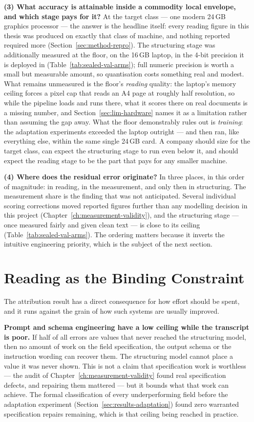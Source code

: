 \textbf{(3) What accuracy is attainable inside a commodity local envelope, and which stage pays
for it?} At the target class --- one modern 24\,\ac{GB} graphics processor --- the answer is
the headline itself: every reading figure in this thesis was produced on exactly that class of
machine, and nothing reported required more (Section~\ref{sec:method-repro}). The structuring stage
was additionally measured at the floor, on the 16\,\ac{GB} laptop, in the 4-bit precision it
is deployed in (Table~\ref{tab:sealed-val-arms}); full numeric precision is worth a small but
measurable amount, so quantisation costs something real and modest. What remains unmeasured is
the floor's \emph{reading} quality: the laptop's memory ceiling forces a pixel cap that reads
an A4 page at roughly half resolution, so while the pipeline loads and runs there, what it
scores there on real documents is a missing number, and Section~\ref{sec:lim-hardware} names it as a
limitation rather than assuming the gap away. What the floor demonstrably rules out is
\emph{training}: the adaptation experiments exceeded the laptop outright --- and then ran,
like everything else, within the same single 24\,\ac{GB} card. A company should size for the
target class, can expect the structuring stage to run even below it, and should expect the
reading stage to be the part that pays for any smaller machine.

\textbf{(4) Where does the residual error originate?} In three places, in this order of
magnitude: in reading, in the measurement, and only then in structuring. The measurement share
is the finding that was not anticipated. Several individual scoring corrections moved reported
figures further than any modelling decision in this project
(Chapter~\ref{ch:measurement-validity}), and the structuring stage --- once measured fairly and
given clean text --- is close to its ceiling
(Table~\ref{tab:sealed-val-arms}). The ordering matters because it inverts the intuitive
engineering priority, which is the subject of the next section.

\section{Reading as the Binding Constraint}
\label{sec:disc-reading-constraint}

The attribution result has a direct consequence for how effort should be spent, and it runs
against the grain of how such systems are usually improved.

\textbf{Prompt and schema engineering have a low ceiling while the transcript is poor.} If half
of all errors are values that never reached the structuring model, then no amount of work on the
field specification, the output schema or the instruction wording can recover them. The
structuring model cannot place a value it was never shown. This is not a claim that
specification work is worthless --- the audit of
Chapter~\ref{ch:measurement-validity} found real specification defects, and repairing them
mattered --- but it bounds what that work can achieve. The formal classification of every
underperforming field before the adaptation experiment
(Section~\ref{sec:results-adaptation}) found zero warranted specification repairs remaining, which is
that ceiling being reached in practice.

